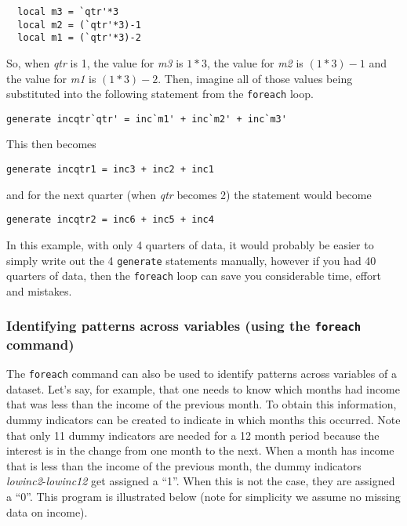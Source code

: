 \begin{lstlisting}
  local m3 = `qtr'*3
  local m2 = (`qtr'*3)-1
  local m1 = (`qtr'*3)-2
\end{lstlisting}

So, when \textit{qtr} is 1, the value for \textit{m3} is $1*3$, the value for \textit{m2} is $(1*3)-1$ and the value for \textit{m1} is $(1*3)-2$.  Then, imagine all of those values being substituted into the following statement from the \lstinline{foreach} loop.

\begin{lstlisting}
generate incqtr`qtr' = inc`m1' + inc`m2' + inc`m3'
\end{lstlisting}

This then becomes

\begin{lstlisting}
generate incqtr1 = inc3 + inc2 + inc1
\end{lstlisting}

and for the next quarter (when \textit{qtr} becomes 2) the statement would become

\begin{lstlisting}
generate incqtr2 = inc6 + inc5 + inc4
\end{lstlisting}

In this example, with only 4 quarters of data, it would probably be easier to simply write out the 4 \lstinline{generate} statements manually, however if you had 40 quarters of data, then the \lstinline{foreach} loop can save you considerable time, effort and mistakes.

\subsubsection{Identifying patterns across variables (using the \lstinline{foreach} command)}

The \lstinline{foreach} command can also be used to identify patterns across variables of a dataset.  Let's say, for example, that one needs to know which months had income that was less than the income of the previous month. To obtain this information, dummy indicators can be created to indicate in which months this occurred. Note that only 11 dummy indicators are needed for a 12 month period because the interest is in the change from one month to the next.  When a month has income that is less than the income of the previous month, the dummy indicators \textit{lowinc2}-\textit{lowinc12} get assigned a ``1''.  When this is not the case, they are assigned a ``0''.   This program is illustrated below (note for simplicity we assume no missing data on income).

